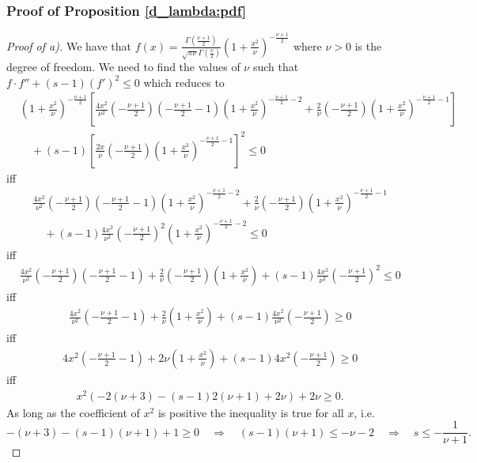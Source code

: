 \documentclass{article} %
\begin{document}
\subsubsection{Proof of Proposition \ref{d_lambda:pdf}}\label{Proof-of-d_lambda:pdf}
\begin{proof}[Proof of a)]
We have that $f(x) = \frac{\Gamma\left(\frac{\nu+1}{2}\right)}{\sqrt{\pi \nu} \Gamma\left(\frac{\nu}{2}\right)}\left(1+\frac{x^2}{\nu}\right)^{-\frac{\nu+1}{2}}$ where $\nu >0$ is the degree of freedom. We need to find the values of $\nu$ such that $f \cdot f'' + (s - 1) (f')^2 \leq 0$ which reduces to 
\begin{align*}
&\left(1+\frac{x^2}{\nu}\right)^{-\frac{\nu+1}{2}}\left[\frac{4x^2}{\nu^2}\left(-\frac{\nu +1}{2} \right)\left(-\frac{\nu +1}{2}-1 \right)\left(1+\frac{x^2}{\nu}\right)^{-\frac{\nu+1}{2}-2} +\frac{2}{\nu}\left(-\frac{\nu +1}{2} \right)\left(1+\frac{x^2}{\nu}\right)^{-\frac{\nu+1}{2}-1}\right]\\
&\quad+(s -1) \left[\frac{2x}{\nu}\left(-\frac{\nu +1}{2} \right)\left(1+\frac{x^2}{\nu}\right)^{-\frac{\nu+1}{2}-1} \right]^2 \leq 0    
\end{align*}
iff
\begin{align*}
&\frac{4x^2}{\nu^2}\left(-\frac{\nu +1}{2} \right)\left(-\frac{\nu +1}{2}-1 \right)\left(1+\frac{x^2}{\nu}\right)^{-\frac{\nu+1}{2}-2} +\frac{2}{\nu}\left(-\frac{\nu +1}{2} \right)\left(1+\frac{x^2}{\nu}\right)^{-\frac{\nu+1}{2}-1}\\
&\quad+(s -1) \frac{4x^2}{\nu^2}\left(-\frac{\nu +1}{2} \right)^2\left(1+\frac{x^2}{\nu}\right)^{-\frac{\nu+1}{2}-2} \leq 0    
\end{align*}
iff
\begin{align*}
&\frac{4x^2}{\nu^2}\left(-\frac{\nu +1}{2} \right)\left(-\frac{\nu +1}{2}-1 \right) +\frac{2}{\nu}\left(-\frac{\nu +1}{2} \right)\left(1+\frac{x^2}{\nu}\right)+(s -1) \frac{4x^2}{\nu^2}\left(-\frac{\nu +1}{2} \right)^2 \leq 0    
\end{align*}
iff
\begin{align*}
&\frac{4x^2}{\nu^2}\left(-\frac{\nu +1}{2}-1 \right) +\frac{2}{\nu}\left(1+\frac{x^2}{\nu}\right)+(s -1) \frac{4x^2}{\nu^2}\left(-\frac{\nu +1}{2} \right) \geq 0
\end{align*}
iff
\begin{align*}
&4x^2\left(-\frac{\nu +1}{2}-1 \right) +2\nu\left(1+\frac{x^2}{\nu}\right)+(s -1)4x^2\left(-\frac{\nu +1}{2} \right) \geq 0
\end{align*}
iff
\begin{align*}
&x^2\left(-2(\nu +3) -(s-1)2(\nu+1) +2\nu\right) +2\nu\geq 0.
\end{align*}
As long as the coefficient of $x^2$ is positive the inequality is true for all $x$, i.e.
$$
-(\nu + 3) -(s-1)(\nu+1) +1 \geq 0 \quad  \Rightarrow \quad 
(s-1)(\nu+1) \leq -\nu - 2 \quad  \Rightarrow \quad s \leq -\frac{1}{\nu +1}.
$$
\end{proof}
\end{document}
